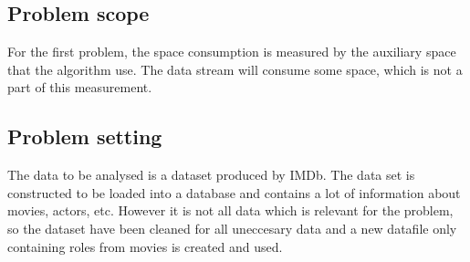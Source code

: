 \subsection{Problem scope}
For the first problem, the space consumption is measured by the auxiliary space that the algorithm use. The data stream will consume some space, which is not a part of this measurement.

\subsection{Problem setting}
The data to be analysed is a dataset produced by IMDb. The data set is constructed to be loaded into a database and contains a lot of information about movies, actors, etc. However it is not all data which is relevant for the problem, so the dataset have been cleaned for all uneccesary data and a new datafile only containing roles from movies is created and used.